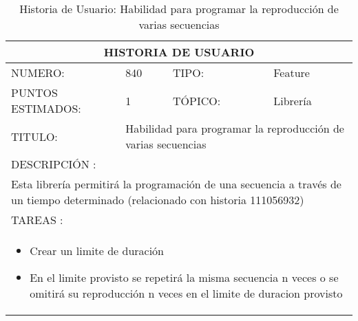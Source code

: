 \begin{table}[h]
\centering
\renewcommand{\arraystretch}{1.4}
\begin{tabular}{|*{4}{l|}}
\hline
\multicolumn{4}{|c|}{HISTORIA DE USUARIO} \\ \hline
NUMERO: & 840 & TIPO: & Feature \\ \hline
PUNTOS ESTIMADOS: & 1 & TÓPICO: & Librería \\ \hline
TITULO: & \multicolumn{3}{|p{7.2cm}|}{ Habilidad para programar la reproducción de varias secuencias} \\ \hline
\multicolumn{4}{|l|}{DESCRIPCIÓN : } \\ \hline
\multicolumn{4}{|p{11cm}|}{Esta librería permitirá la programación de una secuencia a través de un tiempo determinado (relacionado con historia 111056932)} \\ \hline
\multicolumn{4}{|l|}{TAREAS : } \\ \hline
\multicolumn{4}{|p{11cm}|}{
\begin{minipage}[t]{\hsize}
  \begin{itemize}
    \item Crear un limite de duración
    \item En el limite provisto se repetirá la misma secuencia n veces o se omitirá su reproducción n veces en el limite de duracion provisto
  \end{itemize}
\end{minipage}
} \\ \hline
\end{tabular}
\caption{Historia de Usuario: Habilidad para programar la reproducción de varias secuencias}
\label{tab:Primero}
\end{table}





